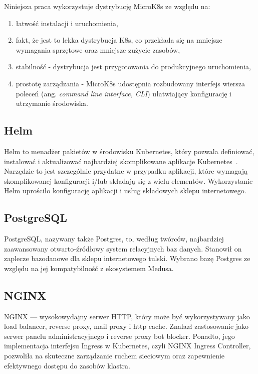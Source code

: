 Niniejsza praca wykorzystuje dystrybucję MicroK8s\cite{microk8s-docs-home} ze względu na:
\begin{enumerate}
    \item łatwość instalacji i uruchomienia,
    \item fakt, że jest to lekka dystrybucja K8s, co przekłada się na mniejsze wymagania sprzętowe oraz mniejsze zużycie zasobów,
    \item stabilność - dystrybucja jest przygotowania do produkcyjnego uruchomienia,
    \item prostotę zarządzania - MicroK8s udostępnia rozbudowany interfejs wiersza poleceń (ang. \emph{command line interface, CLI}) ułatwiający konfigurację i utrzymanie środowiska.
\end{enumerate}

\subsection{Helm}\label{subsec:helm}

Helm to menadżer pakietów w środowisku Kubernetes, który pozwala definiować, instalować i aktualizować najbardziej skomplikowane aplikacje Kubernetes~\cite{helm-home}.
Narzędzie to jest szczególnie przydatne w przypadku aplikacji, które wymagają skomplikowanej konfiguracji i/lub składają się z wielu elementów.
Wykorzystanie Helm uprościło konfigurację aplikacji i usług składowych sklepu internetowego.

\subsection{PostgreSQL}\label{subsec:postgresql}

PostgreSQL, nazywany także Postgres, to, według twórców, najbardziej zaawansowany otwarto-źródłowy system relacyjnych baz danych\cite{postgresql-home}.
Stanowił on zaplecze bazodanowe dla sklepu internetowego tulski.
Wybrano bazę Postgres ze względu na jej kompatybilność z ekosystemem Medusa.

\subsection{NGINX}\label{subsec:nginx}

NGINX --- wysokowydajny serwer HTTP, który może być wykorzystywany jako load balancer, reverse proxy, mail proxy i http cache.
Znalazł zastosowanie jako serwer panelu administracyjnego i reverse proxy bot blocker.
Ponadto, jego implementacja interfejsu Ingress w Kubernetes, czyli NGINX Ingress Controller, pozwoliła na skuteczne zarządzanie ruchem sieciowym oraz zapewnienie efektywnego dostępu do zasobów klastra.

